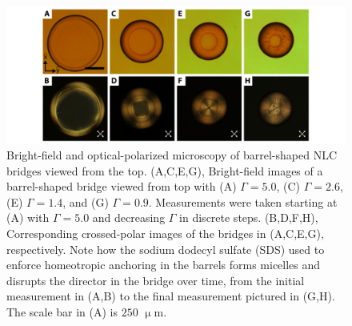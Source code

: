 \begin{figure}
  \centering
  \includegraphics{figures/C5/Ch5-Figs_ExpBarrelTop.png}
  \caption{Bright-field and optical-polarized microscopy of barrel-shaped NLC bridges viewed from the top.
  (A,C,E,G), Bright-field images of a barrel-shaped bridge viewed from top with (A) $\Gamma = 5.0$, (C) $\Gamma = 2.6$, (E) $\Gamma = 1.4$, and (G) $\Gamma = 0.9$.
  Measurements were taken starting at (A) with $\Gamma = 5.0$ and decreasing $\Gamma$ in discrete steps.
  (B,D,F,H), Corresponding crossed-polar images of the bridges in (A,C,E,G), respectively.
  Note how the sodium dodecyl sulfate (SDS) used to enforce homeotropic anchoring in the barrels forms micelles and disrupts the director in the bridge over time, from the initial measurement in (A,B) to the final measurement pictured in (G,H).
  The scale bar in (A) is $250$ $\upmu$m.}\label{f:5-ExpBarrelTop}
\end{figure}

